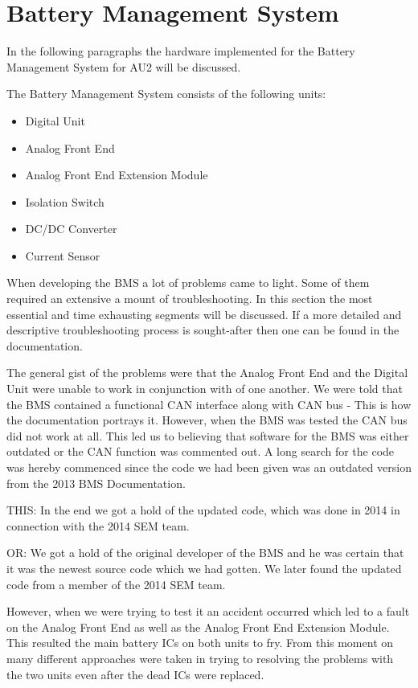 \section{Battery Management System}
In the following paragraphs the hardware implemented for the Battery Management System for AU2 will be discussed. 

The Battery Management System consists of the following units:
\begin{itemize}
	\item{Digital Unit}
	\item{Analog Front End}
	\item{Analog Front End Extension Module}
	\item{Isolation Switch}
	\item{DC/DC Converter}
	\item{Current Sensor}
\end{itemize}

When developing the BMS a lot of problems came to light. Some of them required an extensive a mount of troubleshooting. In this section the most essential and time exhausting segments will be discussed. If a more detailed and descriptive troubleshooting process is sought-after then one can be found in the documentation\cite{AU2}.

The general gist of the problems were that the Analog Front End and the Digital Unit were unable to work in conjunction with of one another. We  were told that the BMS contained a functional CAN interface along with CAN bus - This is how the documentation portrays it. However, when the BMS was tested the CAN bus did not work at all. This led us to believing that software for the BMS was either outdated or the CAN function was commented out. A long search for the code was hereby commenced since the code we had been given was an outdated version from the 2013 BMS Documentation\cite{BMSDocumentation}. 

THIS: In the end we got a hold of the updated code, which was done in 2014 in connection with the 2014 SEM team.

OR: We got a hold of the original developer of the BMS and he was certain that it was the newest source code which we had gotten. We later found the updated code from a member of the 2014 SEM team. 

However, when we were trying to test it an accident occurred which led to a fault on the Analog Front End as well as the Analog Front End Extension Module. This resulted the main battery ICs on both units to fry.
From this moment on many different approaches were taken in trying to resolving the problems with the two units even after the dead ICs were replaced. 
